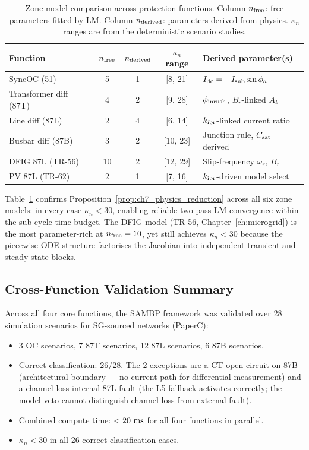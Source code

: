 \begin{table}[ht]
  \centering
  \caption{Zone model comparison across protection functions.
  Column $n_{\rm free}$: free parameters fitted by LM.
  Column $n_{\rm derived}$: parameters derived from physics.
  $\kappa_n$ ranges are from the deterministic scenario studies.}
  \label{tab:ch7_model_compare}
  \small
  \begin{tabular}{lcccp{3.8cm}}
    \toprule
    Function & $n_{\rm free}$ & $n_{\rm derived}$ & $\kappa_n$ range & Derived parameter(s) \\
    \midrule
    SyncOC (51) & 5 & 1 & [8, 21] & $I_{\rm dc} = -I_{\rm sub}\sin\phi_a$ \\
    Transformer diff (87T) & 4 & 2 & [9, 28] & $\phi_{\rm inrush}$, $B_r$-linked $A_k$ \\
    Line diff (87L) & 2 & 4 & [6, 14] & $k_{\rm ibr}$-linked current ratio \\
    Busbar diff (87B) & 3 & 2 & [10, 23] & Junction rule, $C_{\rm sat}$ derived \\
    DFIG 87L (TR-56) & 10 & 2 & [12, 29] & Slip-frequency $\omega_r$, $B_r$ \\
    PV 87L (TR-62) & 2 & 1 & [7, 16] & $k_{\rm ibr}$-driven model select \\
    \bottomrule
  \end{tabular}
\end{table}

Table~\ref{tab:ch7_model_compare} confirms Proposition~\ref{prop:ch7_physics_reduction}
across all six zone models: in every case $\kappa_n < 30$, enabling reliable
two-pass LM convergence within the sub-cycle time budget.  The DFIG model
(TR-56, Chapter~\ref{ch:microgrid}) is the most parameter-rich at
$n_{\rm free} = 10$, yet still achieves $\kappa_n < 30$ because the piecewise-ODE
structure factorises the Jacobian into independent transient and steady-state
blocks.

\subsection{Cross-Function Validation Summary}
\label{sec:ch7_cross_val}

Across all four core functions, the SAMBP framework was validated over
28 simulation scenarios for SG-sourced networks (PaperC):
\begin{itemize}
  \item 3 OC scenarios, 7 87T scenarios, 12 87L scenarios, 6 87B scenarios.
  \item Correct classification: 26/28.
    The 2 exceptions are a CT open-circuit on 87B (architectural boundary
    — no current path for differential measurement) and a channel-loss
    internal 87L fault (the L5 fallback activates correctly; the model veto
    cannot distinguish channel loss from external fault).
  \item Combined compute time: $< 20\,\,\mathrm{ms}$ for all four functions in parallel.
  \item $\kappa_n < 30$ in all 26 correct classification cases.
\end{itemize}

